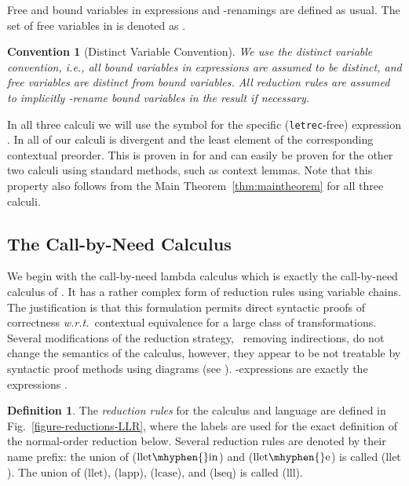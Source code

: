 \documentclass{LMCS}
\theoremstyle{plain}
\newtheorem{convention}[thm]{Convention}
\theoremstyle{definition}
\newtheorem{definition}[thm]{Definition}
\newcommand{\ie}{{\em i.e.}}
\newcommand{\wrt}{{\em w.r.t.}}
\newcommand{\FIGURE}{Fig.}
\newcommand{\redrule}[1]{{\ensuremath{\mathrm{{#1}}}}}
\newcommand{\rlapp}{\redrule{lapp}}
\newcommand{\rlcase}{\redrule{lcase}}
\newcommand{\rlseq}{\redrule{lseq}}
\newcommand{\rlletin}{\redrule{llet\mhyphen{}in}}
\newcommand{\rllet}{\redrule{llet}}
\newcommand{\rllete}{\redrule{llet\mhyphen{}e}}
\newcommand{\rlll}{\redrule{lll}}
\newcommand{\tletrec}{{\tt letrec}}
\begin{document}
Free and bound variables in expressions and -renamings are defined as usual.
The set of free variables in  is denoted as .

\begin{convention}[Distinct Variable Convention]
We use the {\em distinct variable convention}, \ie, all bound variables in expressions
are assumed to be distinct, and free variables are distinct from bound variables.
All reduction rules are assumed to implicitly -rename bound variables 
in the result if necessary. 
\end{convention}

In all three calculi we will use the symbol  for the specific 
(\tletrec-free) expression . 
In all of our calculi  is divergent and the least element of the 
corresponding contextual preorder.
This is proven in \cite{schmidt-schauss-schuetz-sabel:08} for  and
can easily be proven for the other two calculi using standard methods, 
such as context lemmas. 
Note that this property also follows from the Main Theorem~\ref{thm:maintheorem}
for all three calculi.


\subsection{\texorpdfstring{The Call-by-Need Calculus }{The Call-by-Need-Calculus LR}}\label{sec:LR-calc}
We begin with the call-by-need lambda calculus  which is exactly the 
call-by-need calculus of \cite{schmidt-schauss-schuetz-sabel:08}.
It has a rather complex form of reduction rules using variable chains. 
The justification is that this formulation permits direct syntactic proofs
of correctness \wrt\ contextual equivalence for a large class of transformations. 
Several modifications of the reduction strategy, \ removing indirections, do 
not change the semantics of the calculus, however, they appear to be not 
treatable by syntactic proof methods using diagrams 
(see \cite{schmidt-schauss-schuetz-sabel:08}). 
-expressions are exactly the expressions .

\begin{definition}\label{def-red-rules} 
The {\em reduction rules} for the calculus and language  are defined in 
\FIGURE~\ref{figure-reductions-LLR}, where the labels  are used for the 
exact definition of the normal-order reduction below. 
Several reduction rules are denoted by their name prefix: 
the union of (\rlletin) and (\rllete) is called (\rllet).  
The union of (\rllet), (\rlapp), (\rlcase), and (\rlseq) is called (\rlll).
\end{definition}
\end{document}

